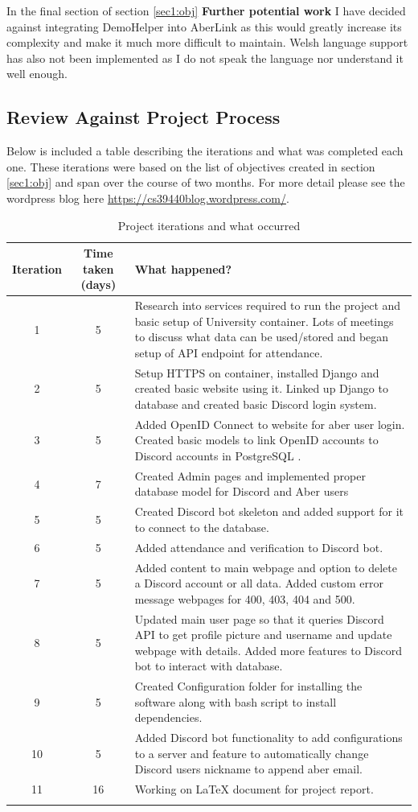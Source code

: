 In the final section of section \ref{sec1:obj} \textbf{Further potential work} I have decided against integrating DemoHelper into AberLink as this would greatly increase its complexity and make it much more difficult to maintain. Welsh language support has also not been implemented as I do not speak the language nor understand it well enough.

\subsection{Review Against Project Process}\label{sec3:pp}

Below is included a table describing the iterations and what was completed each one. These iterations were based on the list of objectives created in section \ref{sec1:obj} and span over the course of two months. For more detail please see the wordpress blog here \href{https://cs39440blog.wordpress.com/}{https://cs39440blog.wordpress.com/}.
\newpage
\begin{longtable}[H]{| c | c | p{9cm} |}
\hline
Iteration & Time taken (days) & What happened? \\
\hline
1 & 5 & Research into services required to run the project and basic setup of University container. Lots of meetings to discuss what data can be used/stored and began setup of API endpoint for attendance. \\
\hline
2 & 5 & Setup HTTPS on container, installed Django \cite{Django} and created basic website using it. Linked up Django to database and created basic Discord login system. \\
\hline
3 & 5 & Added OpenID Connect \cite{OpenID} to website for aber user login. Created basic models to link OpenID accounts to Discord accounts in PostgreSQL \cite{psql}. \\
\hline
4 & 7 & Created Admin pages and implemented proper database model for Discord and Aber users\\
\hline
5 & 5 & Created Discord bot skeleton and added support for it to connect to the database.\\
\hline
6 & 5 & Added attendance and verification to Discord bot. \\
\hline
7 & 5 & Added content to main webpage and option to delete a Discord account or all data. Added custom error message webpages for 400, 403, 404 and 500. \\
\hline
8 & 5 & Updated main user page so that it queries Discord API to get profile picture and username and update webpage with details. Added more features to Discord bot to interact with database.\\
\hline
9 & 5 & Created Configuration folder for installing the software along with bash script to install dependencies.\\
\hline
10 & 5 & Added Discord bot functionality to add configurations to a server and feature to automatically change Discord users nickname to append aber email.\\
\hline
11 & 16 & Working on LaTeX document for project report. \\
\hline
\caption{Project iterations and what occurred}
\label{tab:project-iterations}
\end{longtable}

